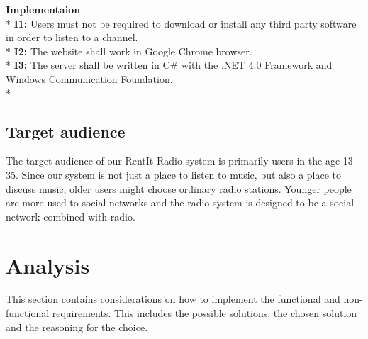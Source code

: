 \documentclass[a4paper,11pt,report]{article}
\begin{document}
{\textbf{Implementaion} \\*
\textbf{I1:} Users must not be required to download or install any third party software in order to listen to a channel. \\*
\textbf{I2:} The website shall work in Google Chrome browser. \\*
\textbf{I3:} The server shall be written in C\# with the .NET 4.0 Framework and Windows Communication Foundation. \\*

\subsection{Target audience}
The target audience of our RentIt Radio system is primarily users in the age 13-35. Since our system is not just a place to listen to music, but also a place to discuss music,  older users might choose ordinary radio stations. Younger people are more used to social networks and the radio system is designed to be a social network combined with radio.

\section{Analysis}
This section contains considerations on how to implement the functional and non-functional requirements. This includes the possible solutions, the chosen solution and the reasoning for the choice.

}
\end{document}
